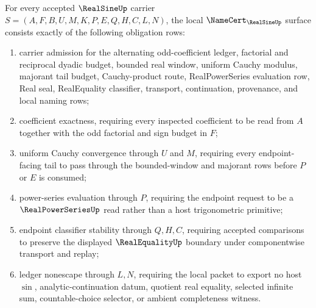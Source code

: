 \begin{theorem}\label{thm:real-sine-namecert-obligations}
For every accepted $\RealSineUp$ carrier $S=(A,F,B,U,M,K,P,E,Q,H,C,L,N)$, the local $\NameCert_{\RealSineUp}$ surface consists exactly of the following obligation rows:
\begin{enumerate}
\item carrier admission for the alternating odd-coefficient ledger, factorial and reciprocal dyadic budget, bounded real window, uniform Cauchy modulus, majorant tail budget, Cauchy-product route, RealPowerSeries evaluation row, Real seal, RealEquality classifier, transport, continuation, provenance, and local naming rows;
\item coefficient exactness, requiring every inspected coefficient to be read from $A$ together with the odd factorial and sign budget in $F$;
\item uniform Cauchy convergence through $U$ and $M$, requiring every endpoint-facing tail to pass through the bounded-window and majorant rows before $P$ or $E$ is consumed;
\item power-series evaluation through $P$, requiring the endpoint request to be a $\RealPowerSeriesUp$ read rather than a host trigonometric primitive;
\item endpoint classifier stability through $Q,H,C$, requiring accepted comparisons to preserve the displayed $\RealEqualityUp$ boundary under componentwise transport and replay;
\item ledger nonescape through $L,N$, requiring the local packet to export no host $\sin$, analytic-continuation datum, quotient real equality, selected infinite sum, countable-choice selector, or ambient completeness witness.
\end{enumerate}
\end{theorem}
